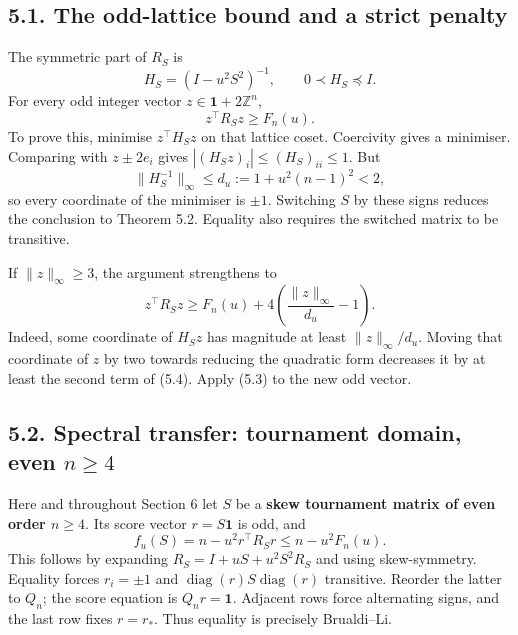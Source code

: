 \documentclass[
  11pt,
  a4paper,
]{article}
\begin{document}
\subsection{5.1. The odd-lattice bound and a strict
penalty}\label{the-odd-lattice-bound-and-a-strict-penalty}

The symmetric part of \(R_S\) is
\[H_S=(I-u^2S^2)^{-1},\qquad0\prec H_S\preceq I.\] For every odd integer
vector \(z\in\mathbf1+2\mathbb Z^n\),
\[z^\top R_Sz\ge F_n(u).                                    \tag{5.3}\]
To prove this, minimise \(z^\top H_Sz\) on that lattice coset.
Coercivity gives a minimiser. Comparing with \(z\pm2e_i\) gives
\(|(H_Sz)_i|\le(H_S)_{ii}\le1\). But
\[\|H_S^{-1}\|_\infty\le d_u:=1+u^2(n-1)^2<2,\] so every coordinate of
the minimiser is \(\pm1\). Switching \(S\) by these signs reduces the
conclusion to Theorem 5.2. Equality also requires the switched matrix to
be transitive.

If \(\|z\|_\infty\ge3\), the argument strengthens to
\[z^\top R_Sz\ge F_n(u)+4\left(\frac{\|z\|_\infty}{d_u}-1\right). \tag{5.4}\]
Indeed, some coordinate of \(H_Sz\) has magnitude at least
\(\|z\|_\infty/d_u\). Moving that coordinate of \(z\) by two towards
reducing the quadratic form decreases it by at least the second term of
(5.4). Apply (5.3) to the new odd vector.

\subsection{\texorpdfstring{5.2. Spectral transfer: tournament domain,
even
\(n\ge4\)}{5.2. Spectral transfer: tournament domain, even n\textbackslash ge4}}\label{spectral-transfer-tournament-domain-even-nge4}

Here and throughout Section 6 let \(S\) be a \textbf{skew tournament
matrix of even order \(n\ge4\)}. Its score vector \(r=S\mathbf1\) is
odd, and
\[f_u(S)=n-u^2r^\top R_Sr\le n-u^2F_n(u).                   \tag{5.5}\]
This follows by expanding \(R_S=I+uS+u^2S^2R_S\) and using
skew-symmetry. Equality forces \(r_i=\pm1\) and
\(\operatorname{diag}(r)S\operatorname{diag}(r)\) transitive. Reorder
the latter to \(Q_n\); the score equation is \(Q_nr=\mathbf1\). Adjacent
rows force alternating signs, and the last row fixes \(r=r_*\). Thus
equality is precisely Brualdi--Li.
\end{document}
